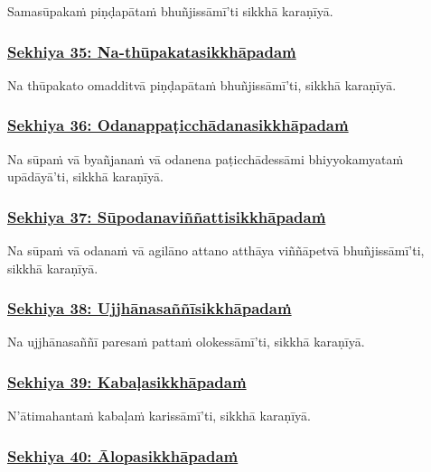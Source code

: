 Samasūpakaṁ piṇḍapātaṁ bhuñjissāmī'ti sikkhā karaṇīyā.



\subsubsection*{\hyperref[training35]{Sekhiya 35: Na-thūpakatasikkhāpadaṁ}}
\label{sekh35}

Na thūpakato omadditvā piṇḍapātaṁ bhuñjissāmī'ti, sikkhā karaṇīyā.



\subsubsection*{\hyperref[training36]{Sekhiya 36: Odanappaṭicchādanasikkhāpadaṁ}}
\label{sekh36}

Na sūpaṁ vā byañjanaṁ vā odanena paṭicchādessāmi bhiyyokamyataṁ upādāyā'ti, sikkhā karaṇīyā.



\subsubsection*{\hyperref[training37]{Sekhiya 37: Sūpodanaviññattisikkhāpadaṁ}}
\label{sekh37}

Na sūpaṁ vā odanaṁ vā agilāno attano atthāya viññāpetvā bhuñjissāmī'ti, sikkhā karaṇīyā.



\subsubsection*{\hyperref[training38]{Sekhiya 38: Ujjhānasaññīsikkhāpadaṁ}}
\label{sekh38}

Na ujjhānasaññī paresaṁ pattaṁ olokessāmī'ti, sikkhā karaṇīyā.



\subsubsection*{\hyperref[training39]{Sekhiya 39: Kabaḷasikkhāpadaṁ}}
\label{sekh39}

N'ātimahantaṁ kabaḷaṁ karissāmī'ti, sikkhā karaṇīyā.



\subsubsection*{\hyperref[training40]{Sekhiya 40: Ālopasikkhāpadaṁ}}
\label{sekh40}

